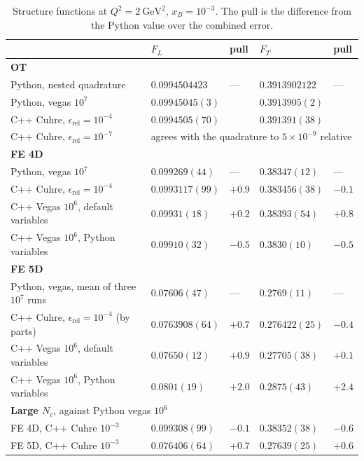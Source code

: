 \documentclass[11pt,a4paper]{article}
\begin{document}
\begin{table}[ht]
  \centering
  \small
  \begin{tabular}{lllll}
    \toprule
    & $F_L$ & pull & $F_T$ & pull \\
    \midrule
    \multicolumn{5}{l}{\textbf{OT}} \\
    Python, nested quadrature            & $0.0994504423$ & --- & $0.3913902122$ & --- \\
    Python, vegas $10^7$                 & $0.09945045(3)$ & & $0.3913905(2)$ & \\
    C++ Cuhre, $\epsilon_{\text{rel}} = 10^{-4}$ & $0.0994505(70)$ & & $0.391391(38)$ & \\
    C++ Cuhre, $\epsilon_{\text{rel}} = 10^{-7}$ & \multicolumn{4}{l}{agrees with the quadrature to $5\times10^{-9}$ relative} \\
    \midrule
    \multicolumn{5}{l}{\textbf{FE 4D}} \\
    Python, vegas $10^7$                 & $0.099269(44)$ & --- & $0.38347(12)$ & --- \\
    C++ Cuhre, $\epsilon_{\text{rel}} = 10^{-4}$ & $0.0993117(99)$ & $+0.9$ & $0.383456(38)$ & $-0.1$ \\
    C++ Vegas $10^6$, default variables   & $0.09931(18)$ & $+0.2$ & $0.38393(54)$ & $+0.8$ \\
    C++ Vegas $10^6$, Python variables    & $0.09910(32)$ & $-0.5$ & $0.3830(10)$ & $-0.5$ \\
    \midrule
    \multicolumn{5}{l}{\textbf{FE 5D}} \\
    Python, vegas, mean of three $10^7$ runs & $0.07606(47)$ & --- & $0.2769(11)$ & --- \\
    C++ Cuhre, $\epsilon_{\text{rel}} = 10^{-4}$ (by parts) & $0.0763908(64)$ & $+0.7$ & $0.276422(25)$ & $-0.4$ \\
    C++ Vegas $10^6$, default variables   & $0.07650(12)$ & $+0.9$ & $0.27705(38)$ & $+0.1$ \\
    C++ Vegas $10^6$, Python variables    & $0.0801(19)$ & $+2.0$ & $0.2875(43)$ & $+2.4$ \\
    \midrule
    \multicolumn{5}{l}{\textbf{Large $N_c$}, against Python vegas $10^6$} \\
    FE 4D, C++ Cuhre $10^{-3}$            & $0.099308(99)$ & $-0.1$ & $0.38352(38)$ & $-0.6$ \\
    FE 5D, C++ Cuhre $10^{-3}$            & $0.076406(64)$ & $+0.7$ & $0.27639(25)$ & $+0.6$ \\
    \bottomrule
  \end{tabular}
  \caption{Structure functions at $Q^2 = 2\ \text{GeV}^2$, $x_B = 10^{-3}$.
    The pull is the difference from the Python value over the combined
    error.}
  \label{tab:python}
\end{table}
\end{document}
